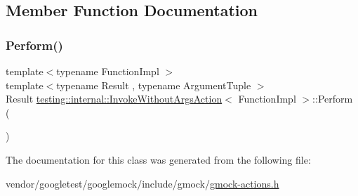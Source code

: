 \subsection{Member Function Documentation}
\mbox{\label{classtesting_1_1internal_1_1_invoke_without_args_action_abdad2b7d19ff1cbd1d07a4bd585e3f4c}} 
\subsubsection{\texorpdfstring{Perform()}{Perform()}}
{\footnotesize\ttfamily template$<$typename Function\+Impl $>$ \\
template$<$typename Result , typename Argument\+Tuple $>$ \\
Result \hyperlink{classtesting_1_1internal_1_1_invoke_without_args_action}{testing\+::internal\+::\+Invoke\+Without\+Args\+Action}$<$ Function\+Impl $>$\+::Perform (\begin{DoxyParamCaption}\item[{const Argument\+Tuple \&}]{ }\end{DoxyParamCaption})\hspace{0.3cm}{\ttfamily [inline]}}



The documentation for this class was generated from the following file\+:\begin{DoxyCompactItemize}
\item 
vendor/googletest/googlemock/include/gmock/\hyperlink{gmock-actions_8h}{gmock-\/actions.\+h}\end{DoxyCompactItemize}
